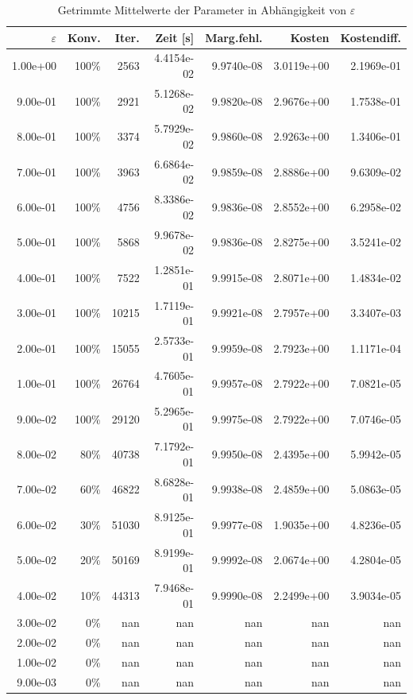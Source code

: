 \begin{table}[htbp]
\caption{Getrimmte Mittelwerte der Parameter in Abhängigkeit von $\varepsilon$}
\label{tab:Parametertest128_tol1e-06}
\small
\centering
{}
\begin{tabular}{rrrrrrr}
\toprule
$\varepsilon$ & Konv. & Iter. & Zeit [s] & Marg.fehl. & Kosten & Kostendiff. \\
\midrule
1.00e+00 & 100\% & 2563 & 4.4154e-02 & 9.9740e-08 & 3.0119e+00 & 2.1969e-01 \\
9.00e-01 & 100\% & 2921 & 5.1268e-02 & 9.9820e-08 & 2.9676e+00 & 1.7538e-01 \\
8.00e-01 & 100\% & 3374 & 5.7929e-02 & 9.9860e-08 & 2.9263e+00 & 1.3406e-01 \\
7.00e-01 & 100\% & 3963 & 6.6864e-02 & 9.9859e-08 & 2.8886e+00 & 9.6309e-02 \\
6.00e-01 & 100\% & 4756 & 8.3386e-02 & 9.9836e-08 & 2.8552e+00 & 6.2958e-02 \\
5.00e-01 & 100\% & 5868 & 9.9678e-02 & 9.9836e-08 & 2.8275e+00 & 3.5241e-02 \\
4.00e-01 & 100\% & 7522 & 1.2851e-01 & 9.9915e-08 & 2.8071e+00 & 1.4834e-02 \\
3.00e-01 & 100\% & 10215 & 1.7119e-01 & 9.9921e-08 & 2.7957e+00 & 3.3407e-03 \\
2.00e-01 & 100\% & 15055 & 2.5733e-01 & 9.9959e-08 & 2.7923e+00 & 1.1171e-04 \\
1.00e-01 & 100\% & 26764 & 4.7605e-01 & 9.9957e-08 & 2.7922e+00 & 7.0821e-05 \\
9.00e-02 & 100\% & 29120 & 5.2965e-01 & 9.9975e-08 & 2.7922e+00 & 7.0746e-05 \\
8.00e-02 & 80\% & 40738 & 7.1792e-01 & 9.9950e-08 & 2.4395e+00 & 5.9942e-05 \\
7.00e-02 & 60\% & 46822 & 8.6828e-01 & 9.9938e-08 & 2.4859e+00 & 5.0863e-05 \\
6.00e-02 & 30\% & 51030 & 8.9125e-01 & 9.9977e-08 & 1.9035e+00 & 4.8236e-05 \\
5.00e-02 & 20\% & 50169 & 8.9199e-01 & 9.9992e-08 & 2.0674e+00 & 4.2804e-05 \\
4.00e-02 & 10\% & 44313 & 7.9468e-01 & 9.9990e-08 & 2.2499e+00 & 3.9034e-05 \\
3.00e-02 & 0\% & nan & nan & nan & nan & nan \\
2.00e-02 & 0\% & nan & nan & nan & nan & nan \\
1.00e-02 & 0\% & nan & nan & nan & nan & nan \\
9.00e-03 & 0\% & nan & nan & nan & nan & nan \\
\bottomrule
\end{tabular}
\end{table}
